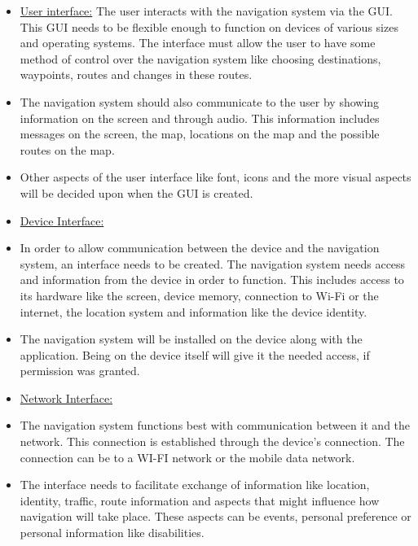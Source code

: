 \documentclass[runningheads,a4paper]{article}
\begin{document}
\begin{itemize}
\item \underline{User interface:} 
The user interacts with the navigation system via the GUI. This GUI needs to be flexible enough to function on devices of various sizes and operating systems. The interface must allow the user to have some method of control over the navigation system like choosing destinations, waypoints, routes and changes in these routes. 

\item The navigation system should also communicate to the user by showing information on the screen and through audio. This information includes messages on the screen, the map, locations on the map and the possible routes on the map.

\item Other aspects of the user interface like font, icons and the more visual aspects will be decided upon when the GUI is created.

\item \underline{Device Interface:}
\item In order to allow communication between the device and the navigation system, an interface needs to be created. The navigation system needs access and information from the device in order to function. This includes access to its hardware like the screen, device memory, connection to Wi-Fi or the internet, the location system and information like the device identity. 

\item The navigation system will be installed on the device along with the application. Being on the device itself will give it the needed access, if permission was granted. 

\item \underline{Network Interface:}
\item The navigation system functions best with communication between it and the network. This connection is established through the device’s connection. The connection can be to a WI-FI network or the mobile data network. 

\item The interface needs to facilitate exchange of information like location, identity, traffic, route information and aspects that might influence how navigation will take place. These aspects can be events, personal preference or personal information like disabilities. 

\end{itemize}
\end{document}
